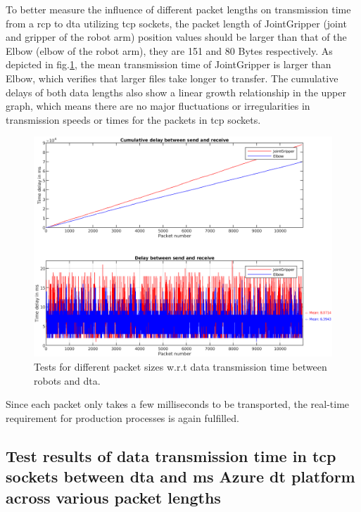 To better measure the influence of different packet lengths on transmission time from 
a \gls{rcp} to \gls{dta} utilizing \gls{tcp} sockets, the packet length of JointGripper 
(joint and gripper of the robot arm) position values should be larger than that of the 
Elbow (elbow of the robot arm), they are 151 and 80 Bytes respectively. As depicted in 
fig.\ref{fig: SR-JointGripper-Elbow}, the mean transmission time of JointGripper is 
larger than Elbow, which verifies that larger files take longer to transfer. 
The cumulative delays of both data lengths also show a linear growth relationship in 
the upper graph, which means there are no major fluctuations or irregularities in 
transmission speeds or times for the packets in \gls{tcp} sockets. 


\begin{figure}[htb]
    \includegraphics[width=\textwidth]{figures/tests/DT/Delay_SendReceive_JointGripper_Elbow.png}
    \centering
    \caption{Tests for different packet sizes w.r.t data transmission time between robots 
    and \gls{dta}. \label{fig: SR-JointGripper-Elbow}}
\end{figure}

Since each packet only takes a few milliseconds to be transported, the real-time 
requirement for production processes is again fulfilled. 



\subsection{Test results of data transmission time in \gls{tcp} sockets between \gls{dta} 
and \gls{ms} Azure \gls{dt} platform across various packet lengths} \label{chap: Result-DTA-DT}

